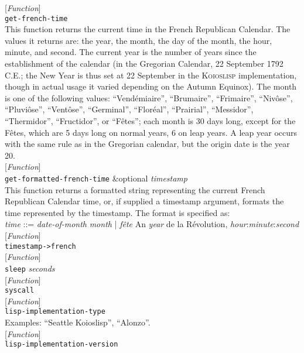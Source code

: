 \documentclass[10pt]{book}
\newenvironment{defother}[2]{[\textit{#1}]\\\texttt{#2}}{\\}
\newenvironment{defun}[1]{\begin{defother}{Function}{#1}}{\end{defother}}
\begin{document}
\begin{defun}{get-french-time}\\
  This function returns the current time in the French Republican Calendar. The values it returns are: the year, the month, the day of the month, the hour, minute, and second. The current year is the number of years since the establishment of the calendar (in the Gregorian Calendar, 22 September 1792 C.E.; the New Year is thus set at 22 September in the \textsc{Koioslisp} implementation, though in actual usage it varied depending on the Autumn Equinox). The month is one of the following values: ``Vend\'{e}miaire'', ``Brumaire'', ``Frimaire'', ``Niv\^{o}se'', ``Pluvi\^{o}se'', ``Vent\^{o}se'', ``Germinal'', ``Flor\'{e}al'', ``Prairial'', ``Messidor'', ``Thermidor'', ``Fructidor'', or ``F\^{e}tes''; each month is 30 days long, except for the F\^{e}tes, which are 5 days long on normal years, 6 on leap years. A leap year occurs with the same rule as in the Gregorian calendar, but the origin date is the year 20.  \end{defun} %
\begin{defun}{get-formatted-french-time} \&optional \textit{timestamp}\\
This function returns a formatted string representing the current French Republican Calendar time, or, if supplied a timestamp argument, formats the time represented by the timestamp. The format is specified as:\\
\textit{time} ::= \textlbrackdbl \textit{date-of-month} \textit{month} | \textit{f\^{e}te} \textrbrackdbl An \textit{year} de la R\'{e}volution, \textit{hour}:\textit{minute}:\textit{second}
\end{defun}
\begin{defun}{timestamp->french}\end{defun}
%
\begin{defun}{sleep} \textit{seconds}\end{defun}
\begin{defun}{syscall}\end{defun} %
\begin{defun}{lisp-implementation-type}\\ Examples: ``Seattle Koioslisp'', ``Alonzo''. \end{defun}
\begin{defun}{lisp-implementation-version}\end{defun}
\end{document}
